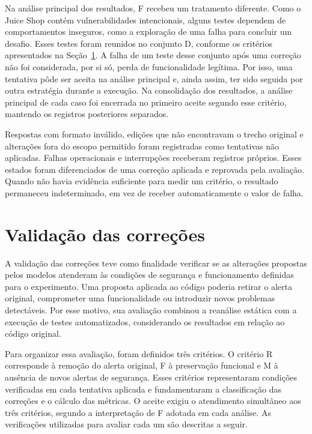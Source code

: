 Na análise principal dos resultados, F recebeu um tratamento diferente. Como o Juice Shop contém vulnerabilidades intencionais, alguns testes dependem de comportamentos inseguros, como a exploração de uma falha para concluir um desafio. Esses testes foram reunidos no conjunto D, conforme os critérios apresentados na Seção~\ref{sec:met-validacao}. A falha de um teste desse conjunto após uma correção não foi considerada, por si só, perda de funcionalidade legítima. Por isso, uma tentativa pôde ser aceita na análise principal e, ainda assim, ter sido seguida por outra estratégia durante a execução. Na consolidação dos resultados, a análise principal de cada caso foi encerrada no primeiro aceite segundo esse critério, mantendo os registros posteriores separados.

Respostas com formato inválido, edições que não encontravam o trecho original e alterações fora do escopo permitido foram registradas como tentativas não aplicadas. Falhas operacionais e interrupções receberam registros próprios. Esses estados foram diferenciados de uma correção aplicada e reprovada pela avaliação. Quando não havia evidência suficiente para medir um critério, o resultado permaneceu indeterminado, em vez de receber automaticamente o valor de falha.

\section{Validação das correções}
\label{sec:met-validacao}

A validação das correções teve como finalidade verificar se as alterações propostas pelos modelos atenderam às condições de segurança e funcionamento definidas para o experimento. Uma proposta aplicada ao código poderia retirar o alerta original, comprometer uma funcionalidade ou introduzir novos problemas detectáveis. Por esse motivo, sua avaliação combinou a reanálise estática com a execução de testes automatizados, considerando os resultados em relação ao código original.

Para organizar essa avaliação, foram definidos três critérios. O critério R corresponde à remoção do alerta original, F à preservação funcional e M à ausência de novos alertas de segurança. Esses critérios representaram condições verificadas em cada tentativa aplicada e fundamentaram a classificação das correções e o cálculo das métricas. O aceite exigiu o atendimento simultâneo aos três critérios, segundo a interpretação de F adotada em cada análise. As verificações utilizadas para avaliar cada um são descritas a seguir.

